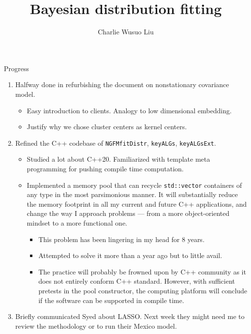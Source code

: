 \documentclass[aspectratio=169]{beamer}
\title{Bayesian distribution fitting}
\author{Charlie Wusuo Liu}
\begin{document}

\begin{frame}{Progress}

\begin{enumerate}
\tiny\item  Halfway done in refurbishing the document on nonstationary covariance model.\medskip

\begin{itemize}
\tiny\item  Easy introduction to clients. Analogy to low dimensional embedding.\medskip

\tiny\item \tiny Justify why we chose cluster centers as kernel centers.\medskip
\end{itemize}

\tiny\item Refined the C++ codebase of \texttt{NGFMfitDistr}, \texttt{keyALGs}, \texttt{keyALGsExt}.\medskip

\begin{itemize}
\tiny\item Studied a lot about C++20. Familiarized with template meta programming for pushing compile time computation.\medskip

\tiny\item Implemented a memory pool that can recycle \texttt{std::vector} containers of any type in the most parsimonious manner. It will substantially reduce the memory footprint in all my current and future C++ applications, and change the way I approach problems --- from a more object-oriented mindset to a more functional one.\medskip

\begin{itemize}
\tiny\item This problem has been lingering in my head for 8 years.\medskip

\tiny\item Attempted to solve it more than a year ago but to little avail.\medskip

\tiny\item The practice will probably be frowned upon by C++ community as it does not entirely conform C++ standard. However, with sufficient pretests in the pool constructor, the computing platform will conclude if the software can be supported in compile time.\medskip
\end{itemize}
 
\end{itemize}

\tiny\item Briefly communicated Syed about LASSO. Next week they might need me to review the methodology or to run their Mexico model.

\end{enumerate}

\end{frame}
\end{document}
